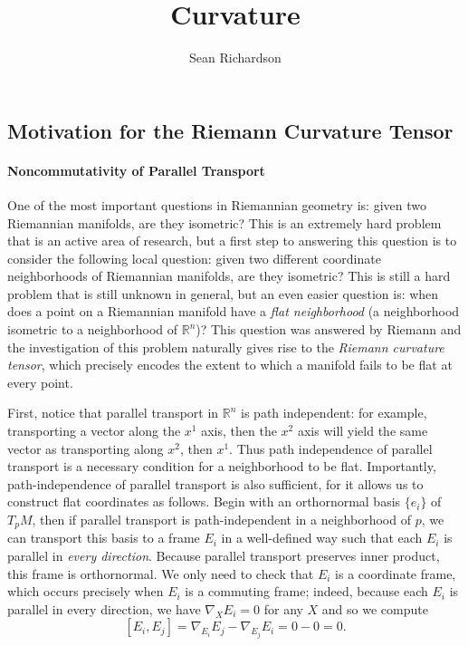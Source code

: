 \documentclass[
]{article}
\title{Curvature}
\author{Sean Richardson}
\date{}
\begin{document}
\maketitle

\hypertarget{motivation-for-the-riemann-curvature-tensor}{%
\subsection{Motivation for the Riemann Curvature
Tensor}\label{motivation-for-the-riemann-curvature-tensor}}

\hypertarget{noncommutativity-of-parallel-transport}{%
\paragraph{Noncommutativity of Parallel
Transport}\label{noncommutativity-of-parallel-transport}}

One of the most important questions in Riemannian geometry is: given two
Riemannian manifolds, are they isometric? This is an extremely hard
problem that is an active area of research, but a first step to
answering this question is to consider the following local question:
given two different coordinate neighborhoods of Riemannian manifolds,
are they isometric? This is still a hard problem that is still unknown
in general, but an even easier question is: when does a point on a
Riemannian manifold have a \emph{flat neighborhood} (a neighborhood
isometric to a neighborhood of \(\mathbb{R}^n\))? This question was
answered by Riemann and the investigation of this problem naturally
gives rise to the \emph{Riemann curvature tensor}, which precisely
encodes the extent to which a manifold fails to be flat at every point.

First, notice that parallel transport in \(\mathbb{R}^n\) is path
independent: for example, transporting a vector along the \(x^1\) axis,
then the \(x^2\) axis will yield the same vector as transporting along
\(x^2\), then \(x^1\). Thus path independence of parallel transport is a
necessary condition for a neighborhood to be flat. Importantly,
path-independence of parallel transport is also sufficient, for it
allows us to construct flat coordinates as follows. Begin with an
orthornormal basis \(\{e_i\}\) of \(T_pM\), then if parallel transport
is path-independent in a neighborhood of \(p\), we can transport this
basis to a frame \(E_i\) in a well-defined way such that each \(E_i\) is
parallel in \emph{every direction}. Because parallel transport preserves
inner product, this frame is orthornormal. We only need to check that
\(E_i\) is a coordinate frame, which occurs precisely when \(E_i\) is a
commuting frame; indeed, because each \(E_i\) is parallel in every
direction, we have \(\nabla_X E_i = 0\) for any \(X\) and so we compute
\[
    [E_i, E_j] = \nabla_{E_i}E_j - \nabla_{E_j}E_i = 0 - 0 = 0.
\]
\end{document}
